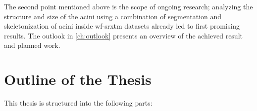 The second point mentioned above is the scope of ongoing research; analyzing the structure and size of the acini using a combination of segmentation and skeletonization of acini inside \ac{wf-srxtm} datasets already led to first promising results. The outlook in \autoref{ch:outlook} presents an overview of the achieved result and planned work.

\section{Outline of the Thesis}
This thesis is structured into the following parts:
